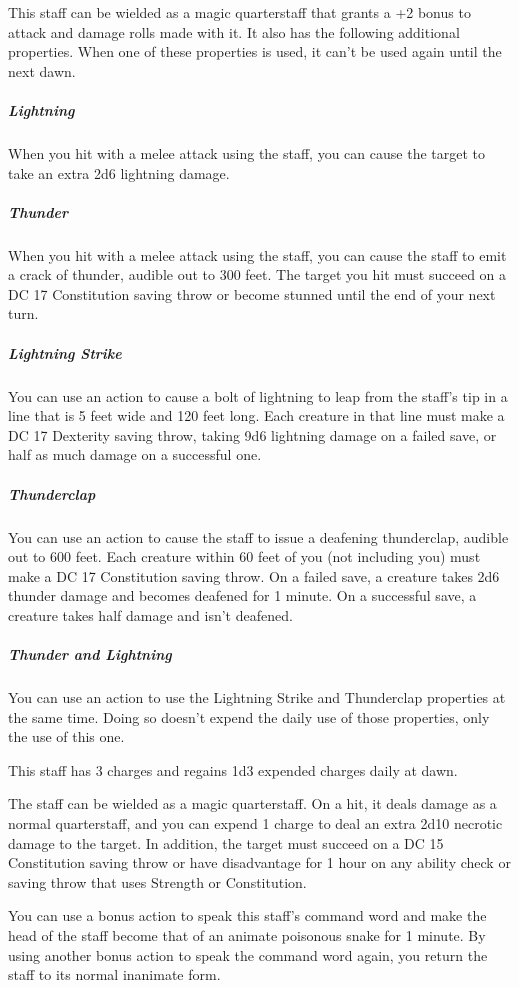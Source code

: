 \documentclass[10pt,a4paper,twoside,bg=print,twocolumn,openany,nodeprecatedcode]{dndbook}
\begin{document}
This staff can be wielded as a magic quarterstaff that grants a +2 bonus to attack and damage rolls made with it. It also has the following additional properties. When one of these properties is used, it can't be used again until the next dawn.

\subparagraph{Lightning}
When you hit with a melee attack using the staff, you can cause the target to take an extra 2d6 lightning damage.

\subparagraph{Thunder}
When you hit with a melee attack using the staff, you can cause the staff to emit a crack of thunder, audible out to 300 feet. The target you hit must succeed on a DC 17 Constitution saving throw or become stunned until the end of your next turn.

\subparagraph{Lightning Strike}
You can use an action to cause a bolt of lightning to leap from the staff's tip in a line that is 5 feet wide and 120 feet long. Each creature in that line must make a DC 17 Dexterity saving throw, taking 9d6 lightning damage on a failed save, or half as much damage on a successful one.

\subparagraph{Thunderclap}
You can use an action to cause the staff to issue a deafening thunderclap, audible out to 600 feet. Each creature within 60 feet of you (not including you) must make a DC 17 Constitution saving throw. On a failed save, a creature takes 2d6 thunder damage and becomes deafened for 1 minute. On a successful save, a creature takes half damage and isn't deafened.

\subparagraph{Thunder and Lightning}
You can use an action to use the Lightning Strike and Thunderclap properties at the same time. Doing so doesn't expend the daily use of those properties, only the use of this one.

This staff has 3 charges and regains 1d3 expended charges daily at dawn.

The staff can be wielded as a magic quarterstaff. On a hit, it deals damage as a normal quarterstaff, and you can expend 1 charge to deal an extra 2d10 necrotic damage to the target. In addition, the target must succeed on a DC 15 Constitution saving throw or have disadvantage for 1 hour on any ability check or saving throw that uses Strength or Constitution.

You can use a bonus action to speak this staff's command word and make the head of the staff become that of an animate poisonous snake for 1 minute. By using another bonus action to speak the command word again, you return the staff to its normal inanimate form.
\end{document}
